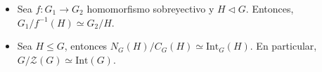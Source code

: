 \begin{coro}
\begin{itemize}
\item Sea $f: G_1 \rightarrow G_2$ homomorfismo sobreyectivo y $H \triangleleft G$. Entonces, $G_1 / f^{-1} \left( H \right) \simeq G_2 / H$.

\item Sea $H \le G$, entonces $N_G\left( H \right) / C_G\left( H \right) \simeq \mathrm{Int}_G\left( H \right)$. En particular, $G/\mathcal{Z}\left( G \right) \simeq \mathrm{Int}\left( G \right)$.
\end{itemize}
\end{coro}

